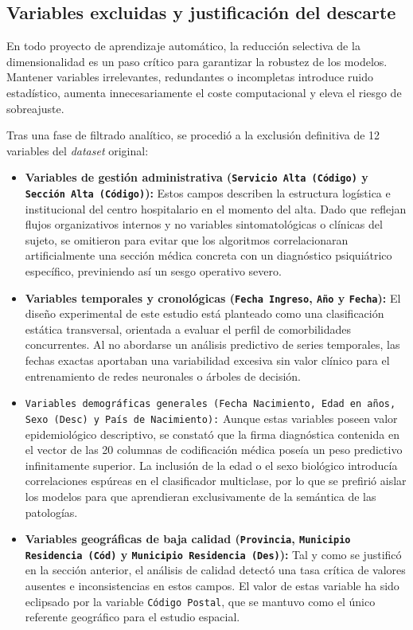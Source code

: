 \documentclass[12pt,a4paper,onecolumn,oneside]{report}
\begin{document}
\subsection{Variables excluidas y justificación del descarte}

En todo proyecto de aprendizaje automático, la reducción selectiva de la dimensionalidad es un paso crítico para garantizar la robustez de los modelos. Mantener variables irrelevantes, redundantes o incompletas introduce ruido estadístico, aumenta innecesariamente el coste computacional y eleva el riesgo de sobreajuste. 

Tras una fase de filtrado analítico, se procedió a la exclusión definitiva de 12 variables del \textit{dataset} original:

\begin{itemize}
    \item \textbf{Variables de gestión administrativa (\texttt{Servicio Alta (Código)} y \texttt{Sección Alta (Código)}):} Estos campos describen la estructura logística e institucional del centro hospitalario en el momento del alta. Dado que reflejan flujos organizativos internos y no variables sintomatológicas o clínicas del sujeto, se omitieron para evitar que los algoritmos correlacionaran artificialmente una sección médica concreta con un diagnóstico psiquiátrico específico, previniendo así un sesgo operativo severo.
    
    \item \textbf{Variables temporales y cronológicas (\texttt{Fecha Ingreso}, \texttt{Año} y \texttt{Fecha}):} El diseño experimental de este estudio está planteado como una clasificación estática transversal, orientada a evaluar el perfil de comorbilidades concurrentes. Al no abordarse un análisis predictivo de series temporales, las fechas exactas aportaban una variabilidad excesiva sin valor clínico para el entrenamiento de redes neuronales o árboles de decisión.
    
    \item \texttt{Variables demográficas generales (\texttt{Fecha Nacimiento}, \texttt{Edad en años}, \texttt{Sexo (Desc)} y \texttt{País de Nacimiento}):} Aunque estas variables poseen valor epidemiológico descriptivo, se constató que la firma diagnóstica contenida en el vector de las 20 columnas de codificación médica poseía un peso predictivo infinitamente superior. La inclusión de la edad o el sexo biológico introducía correlaciones espúreas en el clasificador multiclase, por lo que se prefirió aislar los modelos para que aprendieran exclusivamente de la semántica de las patologías.
    
    \item \textbf{Variables geográficas de baja calidad (\texttt{Provincia}, \texttt{Municipio Residencia (Cód)} y \texttt{Municipio Residencia (Des)}):} Tal y como se justificó en la sección anterior, el análisis de calidad detectó una tasa crítica de valores ausentes e inconsistencias en estos campos. El valor de estas variable ha sido eclipsado por la variable \texttt{Código Postal}, que se mantuvo como el único referente geográfico para el estudio espacial.
\end{itemize}
\end{document}
